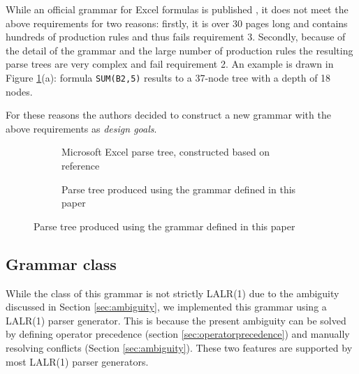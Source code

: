 \documentclass[conference]{IEEEtran}
\begin{document}
While an official grammar for Excel formulas is published \cite{ExcelOfficialGrammar}, it does not meet the above requirements for two reasons: firstly, it is over 30 pages long and contains hundreds of production rules and thus fails requirement 3.
Secondly, because of the detail of the grammar and the large number of production rules the resulting parse trees are very complex and fail requirement 2. An example is drawn in Figure \ref{figure:parsetrees}(a): formula \texttt{SUM(B2,5)} results to a 37-node tree with a depth of 18 nodes.

For these reasons the authors decided to construct a new grammar with the above requirements as \emph{design goals}.

\begin{figure}
	\caption{Parse trees for formula \texttt{SUM(B2,5)}}
	\centering
	\begin{subfigure}[b]{0.3\textwidth}
		\caption{Microsoft Excel parse tree, constructed based on reference \cite{ExcelOfficialGrammar}}
		\hspace{-1.5em}
		\scalebox{.7}{
			
		}
	\end{subfigure}
	
	\begin{subfigure}[b]{0.3\textwidth}
		\vspace{1em}
		\caption{Parse tree produced using the grammar defined in this paper}
		\scalebox{.7}{
			
		}
	\end{subfigure}
	\label{figure:parsetrees}
\end{figure}

\subsection{Grammar class}

While the class of this grammar is not strictly LALR(1) due to the ambiguity discussed in Section \ref{sec:ambiguity}, we implemented this grammar using a LALR(1) parser generator.
This is because the present ambiguity can be solved by defining operator precedence (section \ref{sec:operatorprecedence}) and manually resolving conflicts (Section \ref{sec:ambiguity}).
These two features are supported by most LALR(1) parser generators.
\begin{table}
\caption{Lexical tokens used in the grammar}
\label{table:tokens}

\end{table}
\end{document}
